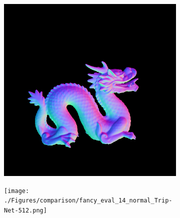 \documentclass[border=15pt, multi, tikz]{article}
\begin{document}
\begin{figure}[H]
\begin{subfigure}[b]{0.24\linewidth}
	\end{subfigure}
	\begin{subfigure}[b]{0.24\linewidth}
		\includegraphics[width=\linewidth]{./Figures/comparison/fancy_eval_22_normal_GCNN-512.png}
	\end{subfigure}
	\begin{subfigure}[b]{0.24\linewidth}
		\texttt{[image: ./Figures/comparison/fancy\_eval\_14\_normal\_Trip-Net-512.png]}
	\end{subfigure}
	

\end{figure}
\end{document}
